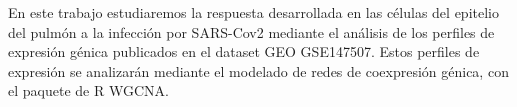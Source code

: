 \documentclass{article}
\begin{document}
		
		En este trabajo estudiaremos la respuesta desarrollada en las células del epitelio del pulmón a la infección por SARS-Cov2 mediante el análisis de los perfiles de expresión génica publicados en el dataset GEO GSE147507. Estos perfiles de expresión se analizarán mediante el modelado de redes de coexpresión génica, con el paquete de R WGCNA.
		
\end{document}
